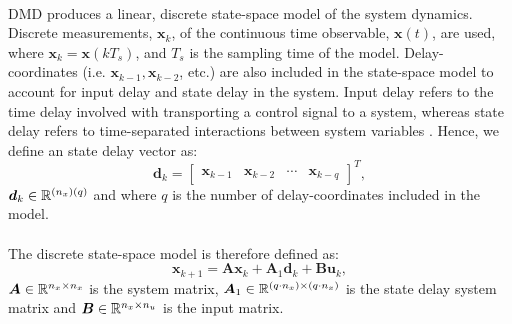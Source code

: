        \paragraph{}
        DMD produces a linear, discrete state-space model of the system dynamics.
        Discrete measurements, $\bm{x}_k$, of the continuous time observable, $\bm{x}(t)$, are used, 
        where $\bm{x}_k = \bm{x}(k T_s)$, and $T_s$ is the sampling time of the model.    
        Delay-coordinates (i.e. $\bm{x}_{k-1}, \bm{x}_{k-2}$, etc.) are also included in the state-space model to
        account for input delay and state delay in the system.
        Input delay refers to the time delay involved with transporting a control signal to a system, 
        whereas state delay refers to time-separated interactions between system variables \cite{Chen1999}.
        Hence, we define an state delay vector as:
        \begin{equation}
            \bm{d}_{k} = 
            \begin{bmatrix}
                \bm{x}_{k-1} & \bm{x}_{k-2} & \cdots & \bm{x}_{k-q}
            \end{bmatrix}^T ,
        \end{equation}
        $\bm{d}_k \in \mathbb{R}^{(n_x)(q)}$ and where $q$ is the number of delay-coordinates included in the model.

        \paragraph{}
        The discrete state-space model is therefore defined as:
        \begin{equation} \label{eq:dmd_state_space}
            \bm{x}_{k+1} = \bm{A} \bm{x}_k + \bm{A}_1 \bm{d}_k + \bm{B} \bm{u}_k ,
        \end{equation}
        \( \bm{A} \in \mathbb{R}^{n_x \times n_x} \) is the system matrix, 
        \( \bm{A}_1 \in \mathbb{R}^{(q \cdot n_x) \times (q \cdot n_x)} \) is the state delay system matrix and 
        \( \bm{B} \in \mathbb{R}^{n_x \times n_u} \) is the input matrix.
        
